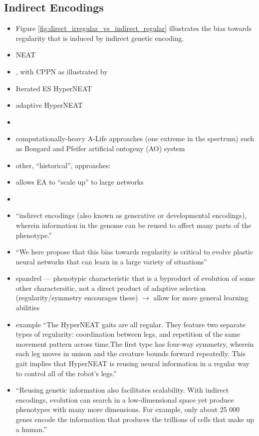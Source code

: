 \subsection{Indirect Encodings} \label{sec:indirect_encodings}
  \begin{itemize}
    \item Figure \ref{fig:direct_irregular_vs_indirect_regular} illustrates the bias towards regularity that is induced by indirect genetic encoding.
  	\item NEAT \cite[p 324]{Downing2015IntelligenceSystems}
    \item , with CPPN as illustrated by 
    \item Iterated ES HyperNEAT 
    \item adaptive HyperNEAT \cite{Risi2010IndirectlyRules}
    \item 
    \item computationally-heavy A-Life approaches (one extreme in the spectrum) such as Bongard and Pfeifer artificial ontogeny (AO) system \cite[p 345]{Downing2015IntelligenceSystems}
    \item other, ``historical'', approaches: 
    \item allows EA to ``scale up'' to large networks
    \item  
    \item ``indirect encodings (also known as generative or developmental encodings), wherein information in the genome can be reused to affect many parts of the phenotype.'' \cite{Clune2011OnRegularity}
    \item ``We here propose that this bias towards regularity is critical to evolve plastic neural networks that can learn in a large variety of situations'' \cite{Tonelli2013OnNetworks}
    \item spandrel --- phenotypic characteristic that is a byproduct of evolution of some other charactersitic, not a direct product of adaptive selection (regularity/symmetry encourages these) $\rightarrow$ allow for more general learning abilities \cite{Tonelli2013OnNetworks}
    \item example ``The HyperNEAT gaits are all regular. They feature two separate types of regularity: coordination between legs, and repetition of the same movement pattern across time.The first type has four-way symmetry, wherein each leg moves in unison and the creature bounds forward repeatedly. This gait implies that HyperNEAT is reusing neural information in a regular way to control all of the robot’s legs.'' \cite{Clune2011OnRegularity}
  \item ``Reusing genetic information also facilitates scalability. With indirect encodings, evolution can search in a low-dimensional space yet produce phenotypes with many more dimensions. For example, only about 25 000 genes encode the information that produces the trillions of cells that make up a human.'' \cite{Clune2011OnRegularity}
  \end{itemize}


